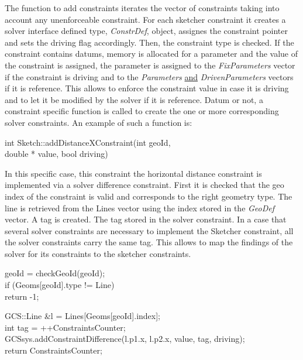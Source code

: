 \documentclass[12pt,twoside,a4paper]{book}
\begin{document}
    The function to add constraints iterates the vector of constraints taking into account any unenforceable constraint. For each sketcher constraint it creates a
    solver interface defined type, \emph{ConstrDef}, object, assignes the constraint pointer and sets the driving flag accordingly. Then, the constraint type is checked. If the constraint contains datums, memory is allocated for a parameter and the value of the constraint is assigned, the parameter is assigned to the \emph{FixParameters} vector if the constraint is driving and to the \emph{Parameters} \underline{and} \emph{DrivenParameters} vectors if it is reference. This allows to enforce the constraint value in case it is driving and to let it be modified by the solver if it is reference. Datum or not, a constraint specific function is called to create the one or more corresponding solver constraints. An example of such a function is:

    \begin{codequote}
    int Sketch::addDistanceXConstraint(int geoId, \\
    \-\hspace{5.5cm}double * value, bool driving)
    \end{codequote}

    In this specific case, this constraint the horizontal distance constraint is implemented via a solver difference constraint. First it is checked that the geo index of the constraint is valid and corresponds to the right geometry type. The line is retrieved from the Lines vector using the index stored in the \emph{GeoDef} vector. A tag is created. The tag stored in the solver constraint. In a case that several solver constraints are necessary to implement the Sketcher constraint, all the solver constraints carry the same tag. This allows to map the findings of the solver for its constraints to the sketcher constraints.

    \begin{codequote}
    geoId = checkGeoId(geoId);\\

    if (Geoms[geoId].type != Line)\\
    \-\hspace{0.75cm}return -1;

    GCS::Line \&l = Lines[Geoms[geoId].index];\\

    int tag = ++ConstraintsCounter;\\
    GCSsys.addConstraintDifference(l.p1.x, l.p2.x, value, tag, driving);\\
    return ConstraintsCounter;
    \end{codequote}
\end{document}
